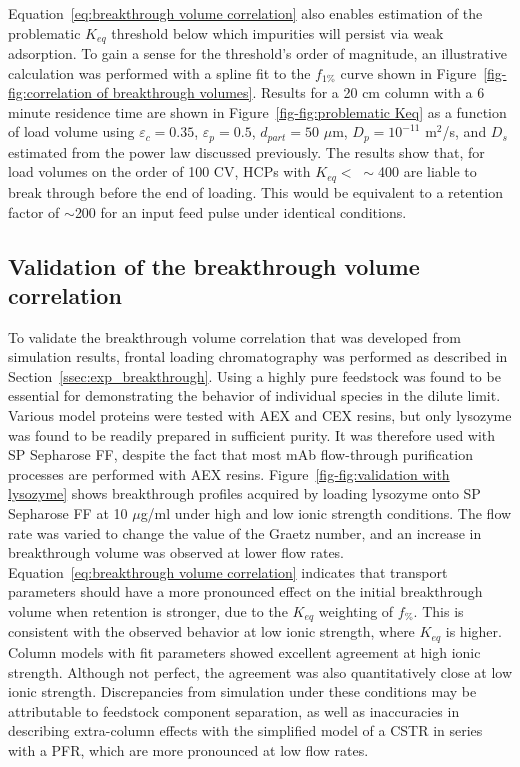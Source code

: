 \documentclass[preprint,review,12pt]{elsarticle}
\begin{document}
        Equation~\ref{eq:breakthrough volume correlation} also enables estimation of the problematic $K_{eq}$ threshold below which impurities will persist via weak adsorption. To gain a sense for the threshold's order of magnitude, an illustrative calculation was performed with a spline fit to the $f_{1\%}$ curve shown in Figure~\ref{fig-fig:correlation of breakthrough volumes}. Results for a 20 cm column with a 6 minute residence time are shown in Figure~\ref{fig-fig:problematic Keq} as a function of load volume using $\varepsilon_c = 0.35$, $\varepsilon_p = 0.5$, $d_{part} = 50$ $\mu$m, $D_p = 10^{-11}$ m$^2$/s, and $D_s$ estimated from the power law discussed previously. The results show that, for load volumes on the order of 100 CV, HCPs with $K_{eq} < \; \sim$400 are liable to break through before the end of loading. This would be equivalent to a retention factor of $\sim$200 for an input feed pulse under identical conditions.


    \subsection{Validation of the breakthrough volume correlation} \label{ssec:validation}
        To validate the breakthrough volume correlation that was developed from simulation results, frontal loading chromatography was performed as described in Section~\ref{ssec:exp_breakthrough}. Using a highly pure feedstock was found to be essential for demonstrating the behavior of individual species in the dilute limit. Various model proteins were tested with AEX and CEX resins, but only lysozyme was found to be readily prepared in sufficient purity. It was therefore used with SP Sepharose FF, despite the fact that most mAb flow-through purification processes are performed with AEX resins. Figure~\ref{fig-fig:validation with lysozyme} shows breakthrough profiles acquired by loading lysozyme onto SP Sepharose FF at 10 $\mu$g/ml under high and low ionic strength conditions. The flow rate was varied to change the value of the Graetz number, and an increase in breakthrough volume was observed at lower flow rates. Equation~\ref{eq:breakthrough volume correlation} indicates that transport parameters should have a more pronounced effect on the initial breakthrough volume when retention is stronger, due to the $K_{eq}$ weighting of $f_\%$. This is consistent with the observed behavior at low ionic strength, where $K_{eq}$ is higher. Column models with fit parameters showed excellent agreement at high ionic strength. Although not perfect, the agreement was also quantitatively close at low ionic strength. Discrepancies from simulation under these conditions may be attributable to feedstock component separation, as well as inaccuracies in describing extra-column effects with the simplified model of a CSTR in series with a PFR, which are more pronounced at low flow rates.
\end{document}
